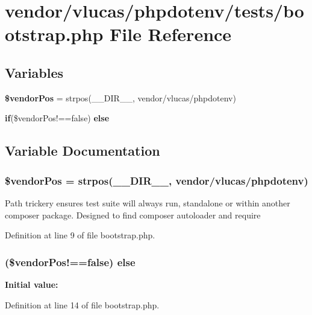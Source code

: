 \section{vendor/vlucas/phpdotenv/tests/bootstrap.php File Reference}
\label{vlucas_2phpdotenv_2tests_2bootstrap_8php}
\subsection*{Variables}
\begin{DoxyCompactItemize}
\item 
{\bf \$vendor\+Pos} = strpos(\+\_\+\+\_\+\+D\+I\+R\+\_\+\+\_\+, \textquotesingle{}vendor/vlucas/phpdotenv\textquotesingle{})
\item 
{\bf if}(\$vendor\+Pos!==false) {\bf else}
\end{DoxyCompactItemize}


\subsection{Variable Documentation}
\subsubsection[{\$vendor\+Pos}]{\setlength{\rightskip}{0pt plus 5cm}\$vendor\+Pos = strpos(\+\_\+\+\_\+\+D\+I\+R\+\_\+\+\_\+, \textquotesingle{}vendor/vlucas/phpdotenv\textquotesingle{})}\label{vlucas_2phpdotenv_2tests_2bootstrap_8php_ab3aa6d88f4804726e26457ffcb919fa4}
Path trickery ensures test suite will always run, standalone or within another composer package. Designed to find composer autoloader and require 

Definition at line 9 of file bootstrap.\+php.

\subsubsection[{else}]{ (\$vendor\+Pos!==false) else}\label{vlucas_2phpdotenv_2tests_2bootstrap_8php_ab60a92723f92f540ee88eb211b95e2cb}
{\bfseries Initial value\+:}


Definition at line 14 of file bootstrap.\+php.

